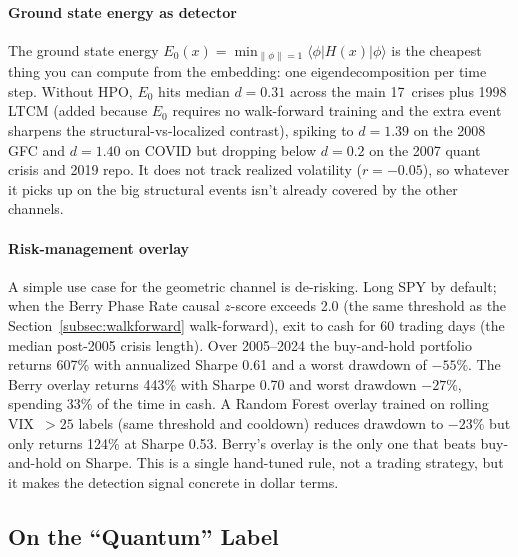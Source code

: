 \documentclass[3p]{elsarticle}
\begin{document}
\paragraph{Ground state energy as detector}
The ground state energy
$E_0(x) = \min_{\|\phi\|=1}\langle\phi|H(x)|\phi\rangle$ is the
cheapest thing you can compute from the embedding: one
eigendecomposition per time step.  Without HPO, $E_0$ hits median
$d = 0.31$ across the main 17~crises plus 1998 LTCM (added because
$E_0$ requires no walk-forward training and the extra event sharpens
the structural-vs-localized contrast), spiking to $d = 1.39$ on the 2008 GFC
and $d = 1.40$ on COVID but dropping below $d = 0.2$ on the 2007
quant crisis and 2019 repo.  It does not track realized volatility
($r = -0.05$), so whatever it picks up on the big structural
events isn't already covered by the other channels.

\paragraph{Risk-management overlay}\label{subsec:overlay}
A simple use case for the geometric channel is de-risking.  Long
SPY by default; when the Berry Phase Rate causal $z$-score
exceeds 2.0 (the same threshold as the Section~\ref{subsec:walkforward}
walk-forward), exit to cash for 60 trading days (the median
post-2005 crisis length).  Over 2005--2024 the buy-and-hold
portfolio returns 607\% with annualized Sharpe 0.61 and a
worst drawdown of $-55\%$.  The Berry overlay returns
443\% with Sharpe 0.70 and worst drawdown $-27\%$,
spending 33\% of the time in cash.  A Random Forest overlay
trained on rolling VIX~$> 25$ labels (same threshold and
cooldown) reduces drawdown to $-23\%$ but only returns
124\% at Sharpe 0.53.  Berry's overlay is the only one that
beats buy-and-hold on Sharpe.  This is a single hand-tuned rule,
not a trading strategy, but it makes the detection signal
concrete in dollar terms.

\subsection{On the ``Quantum'' Label}
\end{document}
